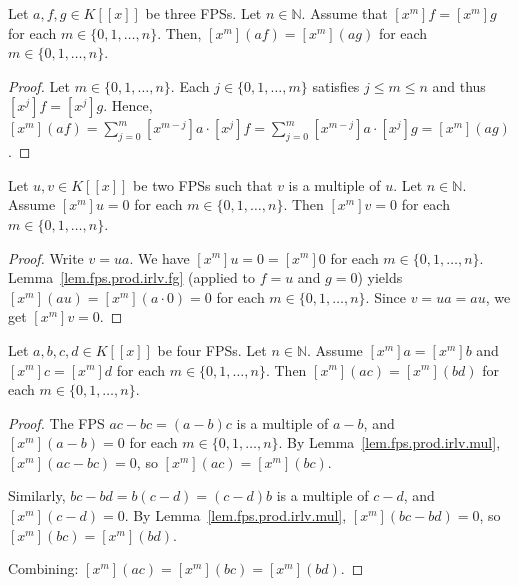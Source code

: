 \begin{lemma}
\label{lem.fps.prod.irlv.fg}
\leantarget
\leanok
Let $a,f,g\in K[[x]]$ be three FPSs. Let $n\in\mathbb{N}$. Assume that
$[x^{m}]f=[x^{m}]g$ for each $m\in\{0,1,\ldots,n\}$.
Then,
$[x^{m}](af)=[x^{m}](ag)$ for each $m\in\{0,1,\ldots,n\}$.
\end{lemma}

\begin{proof}
\leanok
Let $m \in \{0,1,\ldots,n\}$. Each $j \in \{0,1,\ldots,m\}$ satisfies $j \leq m \leq n$
and thus $[x^j]f = [x^j]g$. Hence,
$[x^m](af) = \sum_{j=0}^m [x^{m-j}]a \cdot [x^j]f
= \sum_{j=0}^m [x^{m-j}]a \cdot [x^j]g = [x^m](ag)$.
\end{proof}

\begin{lemma}
\label{lem.fps.prod.irlv.mul}
\leantarget
\leanok
Let $u,v\in K[[x]]$ be two FPSs such that $v$ is a multiple of $u$. Let $n\in\mathbb{N}$. Assume
$[x^{m}]u=0$ for each $m\in\{0,1,\ldots,n\}$.
Then $[x^{m}]v=0$ for each $m\in\{0,1,\ldots,n\}$.
\end{lemma}

\begin{proof}
\leanok
Write $v=ua$. We have $[x^m]u = 0 = [x^m]0$ for each $m \in \{0,1,\ldots,n\}$.
Lemma~\ref{lem.fps.prod.irlv.fg} (applied to $f=u$ and $g=0$) yields
$[x^m](au) = [x^m](a \cdot 0) = 0$ for each $m \in \{0,1,\ldots,n\}$.
Since $v = ua = au$, we get $[x^m]v = 0$.
\end{proof}

\begin{lemma}
\label{lem.fps.prod.irlv.cong-mul}
\leantarget
\leanok
Let $a,b,c,d\in K[[x]]$ be four FPSs. Let $n\in\mathbb{N}$. Assume
$[x^{m}]a=[x^{m}]b$ and $[x^{m}]c=[x^{m}]d$ for each $m\in\{0,1,\ldots,n\}$.
Then $[x^{m}](ac)=[x^{m}](bd)$ for each $m\in\{0,1,\ldots,n\}$.
\end{lemma}

\begin{proof}
\leanok
The FPS $ac - bc = (a-b)c$ is a multiple of $a-b$, and $[x^m](a-b) = 0$
for each $m \in \{0,1,\ldots,n\}$. By Lemma~\ref{lem.fps.prod.irlv.mul},
$[x^m](ac - bc) = 0$, so $[x^m](ac) = [x^m](bc)$.

Similarly, $bc - bd = b(c-d) = (c-d)b$ is a multiple of $c-d$, and
$[x^m](c-d) = 0$. By Lemma~\ref{lem.fps.prod.irlv.mul},
$[x^m](bc - bd) = 0$, so $[x^m](bc) = [x^m](bd)$.

Combining: $[x^m](ac) = [x^m](bc) = [x^m](bd)$.
\end{proof}
